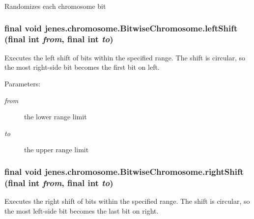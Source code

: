 Randomizes each chromosome bit \hypertarget{classjenes_1_1chromosome_1_1_bitwise_chromosome_b02c791be30c931cae793289185e459f}{
\subsubsection[leftShift]{\setlength{\rightskip}{0pt plus 5cm}final void jenes.chromosome.BitwiseChromosome.leftShift (final int {\em from}, \/  final int {\em to})}}
\label{classjenes_1_1chromosome_1_1_bitwise_chromosome_b02c791be30c931cae793289185e459f}


Executes the left shift of bits within the specified range. The shift is circular, so the most right-side bit becomes the first bit on left.

\begin{Desc}
\item[Parameters:]
\begin{description}
\item[{\em from}]the lower range limit \item[{\em to}]the upper range limit \end{description}
\end{Desc}
\hypertarget{classjenes_1_1chromosome_1_1_bitwise_chromosome_fb689c4b268f7954214a9d0e13c6141e}{
\subsubsection[rightShift]{\setlength{\rightskip}{0pt plus 5cm}final void jenes.chromosome.BitwiseChromosome.rightShift (final int {\em from}, \/  final int {\em to})}}
\label{classjenes_1_1chromosome_1_1_bitwise_chromosome_fb689c4b268f7954214a9d0e13c6141e}


Executes the right shift of bits within the specified range. The shift is circular, so the most left-side bit becomes the last bit on right.


